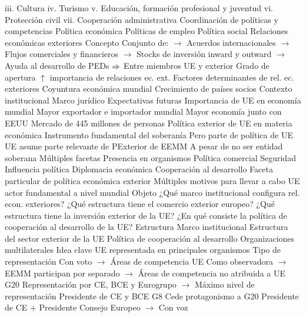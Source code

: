 \documentclass{nuevotema}
\begin{document}
\begin{esquemal}
				\4[] iii. Cultura
				\4[] iv. Turismo
				\4[] v. Educación, formación profesional y juventud
				\4[] vi. Protección civil
				\4[] vii. Cooperación administrativa
				\4 Coordinación de políticas y competencias
				\4[] Política económica
				\4[] Políticas de empleo
				\4[] Política social
			\3 Relaciones económicas exteriores
				\4 Concepto
				\4[] Conjunto de:
				\4[] $\to$ Acuerdos internacionales
				\4[] $\to$ Flujos comerciales y financieros
				\4[] $\to$ Stocks de inversión inward y outward
				\4[] $\to$ Ayuda al desarrollo de PEDs
				\4[] $\Rightarrow$ Entre miembros UE y exterior
				\4 Grado de apertura
				\4[] $\uparrow$ importancia de relaciones ec. ext.
			\3 Factores determinantes de rel. ec. exteriores
				\4 Coyuntura económica mundial
				\4 Crecimiento de países socios
				\4 Contexto institucional
				\4 Marco jurídico
				\4 Expectativas futuras
			\3 Importancia de UE en economía mundial
				\4 Mayor exportador e importador mundial
				\4 Mayor economía junto con EEUU
				\4 Mercado de 445 millones de personas
			\3 Política exterior de UE en materia económica
				\4 Instrumento fundamental del soberanía
				\4[] Pero parte de política de UE
				\4 UE asume parte relevante de PExterior de EEMM
				\4[] A pesar de no ser entidad soberana
				\4 Múltiples facetas
				\4[] Presencia en organismos
				\4[] Política comercial
				\4[] Seguridad
				\4 Influencia política
				\4 Diplomacia económica
			\3 Cooperación al desarrollo
				\4 Faceta particular de política económica exterior
				\4 Múltiples motivos para llevar a cabo
				\4 UE actor fundamental a nivel mundial
		\2 Objeto
			\3 ¿Qué marco institucional configura rel. econ. exteriores?
			\3 ¿Qué estructura tiene el comercio exterior europeo?
			\3 ¿Qué estructura tiene la inversión exterior de la UE?
			\3 ¿En qué consiste la política de cooperación al desarrollo de la UE?
		\2 Estructura
			\3 Marco institucional
			\3 Estructura del sector exterior de la UE
			\3 Política de cooperación al desarrollo
	\1 
		\2 Organizaciones multilaterales
			\3 Idea clave
				\4 UE representada en principales organismos
				\4 Tipo de representación
				\4[] Con voto
				\4[] $\to$ Áreas de competencia UE
				\4[] Como observadora
				\4[] $\to$ EEMM participan por separado
				\4[] $\to$ Áreas de competencia no atribuida a UE
			\3 G20
				\4 Representación por CE, BCE y Eurogrupo
				\4[] $\to$ Máximo nivel de representación
				\4 Presidente de CE y BCE
			\3 G8
				\4 Cede protagonismo a G20
				\4 Presidente de CE + Presidente Consejo Europeo
				\4[] $\to$ Con voz

\end{esquemal}
\end{document}
